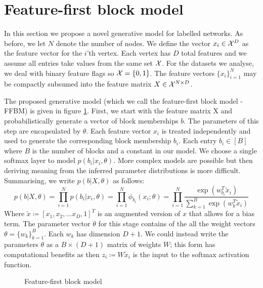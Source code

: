\section{Feature-first block model}

In this section we propose a novel generative model for labelled networks. As before, we let $N$ denote the number of nodes. We define the vector $x_i \in \mathcal{X}^D$ as the feature vector for the $i$'th vertex. Each vertex has $D$ total features and we assume all entries take values from the same set $\mathcal{X}$. For the datasets we analyse, we deal with binary feature flags so $\mathcal{X} = \{0, 1\}$. The feature vectors $\{x_i\}_{i=1}^{N}$ may be compactly subsumed into the feature matrix $X \in \mathcal{X}^{N \times D}$.

The proposed generative model (which we call the feature-first block model - FFBM) is given in figure \ref{fig:ffbm}. First, we start with the feature matrix X and probabilistically generate a vector of block memberships $b$. The parameters of this step are encapsulated by $\theta$. Each feature vector $x_i$ is treated independently and used to generate the corresponding block membership $b_i$. Each entry $b_i \in [B]$ where $B$ is the number of blocks and a constant in our model. We choose a single softmax layer to model $p(b_i | x_i, \theta)$. More complex models are possible but then deriving meaning from the inferred parameter distributions is more difficult. Summarising, we write $p(b | X, \theta)$ as follows:
%
\begin{equation}
	p(b| X, \theta) = \prod_{i=1}^{N} p(b_i | x_i, \theta) = \prod_{i=1}^{N} \phi_{b_i} (x_i; \theta)
	= \prod_{i=1}^{N} \frac{\exp\left(w_{b_i}^T \tilde{x}_i\right)}{\sum_{k=1}^{B} \exp \left( w_k^T \tilde{x}_i\right)}
\end{equation}
%
Where $\tilde{x} \coloneqq \left[x_1, x_2, \dots x_D, 1\right]^T$ is an augmented version of $x$ that allows for a bias term. The parameter vector $\theta$ for this stage contains of the all the weight vectors $\theta = \{w_k\}_{k=1}^{B}$. Each $w_k$ has dimension $D+1$. We could instead write the parameters $\theta$ as a $B \times (D+1)$ matrix of weights $W$; this form has computational benefits as then $z_i \coloneqq W \tilde{x}_i$ is the input to the softmax activation function.

\begin{figure}[!h]
	\centering
	\caption{Feature-first block model}
	\label{fig:ffbm}
\end{figure}

